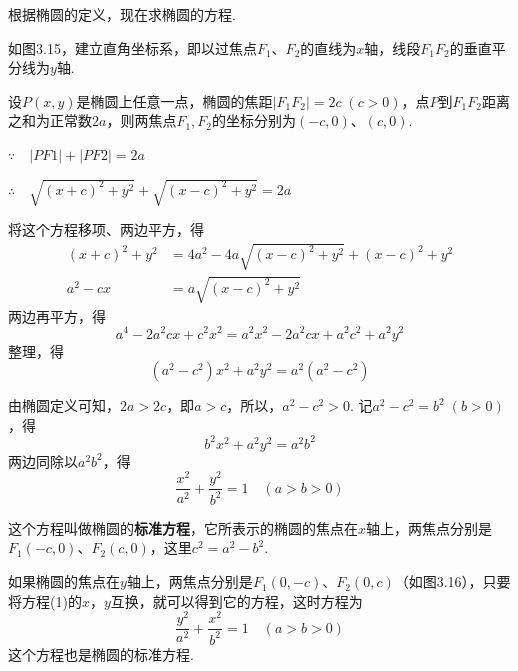 根据椭圆的定义，现在求椭圆的方程.

如图3.15，建立直角坐标系，即以过焦点$F_1$、$F_2$的直线为$x$轴，线段$F_1F_2$的垂直平分线为$y$轴.

设$P(x,y)$是椭圆上任意一点，椭圆的焦距$|F_1F_2|=2c\; (c>0)$，点$P$到$F_1F_2$距离之和为正常数$2a$，则两焦点$F_1,F_2$的坐标分别为$(-c,0)$、$(c,0)$.

$\because\quad |PF1|+|PF2|=2a$

$\therefore\quad \sqrt{(x+c)^2+y^2}+\sqrt{(x-c)^2+y^2}=2a$

将这个方程移项、两边平方，得
\[\begin{split}
    (x+c)^2+y^2&=4a^2-4a\sqrt{(x-c)^2+y^2}+(x-c)^2+y^2\\
    a^2-cx&=a\sqrt{(x-c)^2+y^2}
\end{split} \]
两边再平方，得
\[a^4-2a^2cx+c^2x^2=a^2x^2-2a^2cx+a^2c^2+a^2y^2\]
整理，得
\[(a^2-c^2)x^2+a^2y^2=a^2(a^2-c^2)\]

由椭圆定义可知，$2a>2c$，即$a>c$，所以，$a^2-c^2>0$. 
记$a^2-c^2=b^2\; (b>0)$，得
\[b^2x^2+a^2y^2=a^2b^2\]
两边同除以$a^2b^2$，得
\begin{equation}
    \frac{x^2}{a^2}+\frac{y^2}{b^2}=1\quad (a>b>0) \tag{1}
\end{equation}


\noindent
\begin{minipage}{.63\textwidth}
\CTEXindent
这个方程叫做椭圆的\textbf{标准方程}，它所表示的椭圆的焦点在$x$轴上，两焦点分别是$F_1(-c,0)$、$F_2(c,0)$，这里$c^2=a^2-b^2$.

如果椭圆的焦点在$y$轴上，两焦点分别是$F_1(0,-c)$、$F_2(0,c)$（如图3.16），只要将方程(1)的$x$，$y$互换，就可以得到它的方程，这时方程为
\begin{equation}
    \frac{y^2}{a^2}+\frac{x^2}{b^2}=1\quad (a>b>0) \tag{2}
\end{equation}
这个方程也是椭圆的标准方程.
\end{minipage}
\hfill
\begin{minipage}{.33\textwidth}
\centering
{}
\end{minipage}

